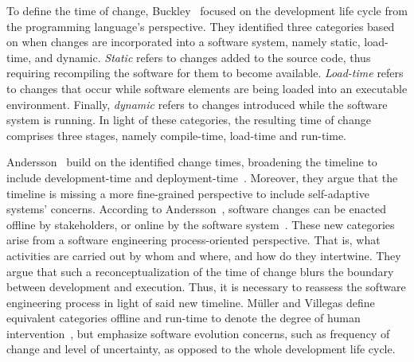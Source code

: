 To define the time of change, Buckley~\etal{} focused on the development life cycle from the programming language's perspective. They identified three categories based on when changes are incorporated into a software system, namely static, load-time, and dynamic. \emph{Static} refers to changes added to the source code, thus requiring recompiling the software for them to become available. \emph{Load-time} refers to changes that occur while software elements are being loaded into an executable environment. Finally, \emph{dynamic} refers to changes introduced while the software system is running. In light of these categories, the resulting time of change comprises three stages, namely compile-time, load-time and run-time.

Andersson~\etal{} build on the identified change times, broadening the timeline to include development-time and deployment-time~\cite{andersson-2013-software}. Moreover, they argue that the timeline is missing a more fine-grained perspective to include self-adaptive systems' concerns. According to Andersson~\etal{}, software changes can be enacted offline by stakeholders, or online by the software system~\cite{andersson-2013-software}. These new categories arise from a software engineering process-oriented perspective. That is, what activities are carried out by whom and where, and how do they intertwine. They argue that such a reconceptualization of the time of change blurs the boundary between development and execution. Thus, it is necessary to reassess the software engineering process in light of said new timeline. M\"{u}ller and Villegas define equivalent categories offline and run-time to denote the degree of human intervention~\cite{muller-2014-highly}, but emphasize software evolution concerns, such as frequency of change and level of uncertainty, as opposed to the whole development life cycle.

